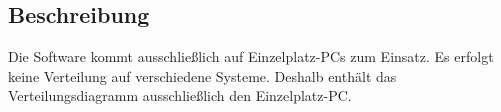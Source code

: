 \subsection{Beschreibung}
Die Software kommt ausschließlich auf Einzelplatz-PCs zum Einsatz. Es erfolgt keine Verteilung auf verschiedene Systeme. Deshalb enthält das Verteilungsdiagramm ausschließlich den Einzelplatz-PC.




